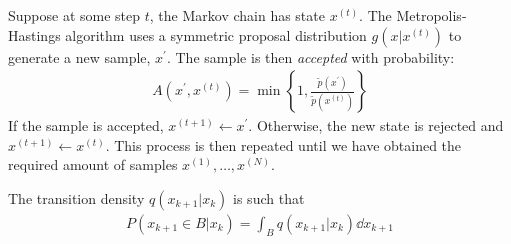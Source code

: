 Suppose at some step $t$, the Markov chain has state $x^{(t)}$. The Metropolis-Hastings algorithm uses a symmetric proposal distribution $g(x|x^{(t)})$ to generate a new sample, $x^\prime$. The sample is then \emph{accepted} with probability:
\begin{align*}
    A(x^{\prime}, x^{(t)}) = \min\left\{1, \frac{\tilde{p}(x^\prime)}{\tilde{p}(x^{(t)})}\right\}
\end{align*}
If the sample is accepted, $x^{(t+1)} \gets x^\prime$. Otherwise, the new state is rejected and $x^{(t+1)} \gets x^{(t)}$. This process is then repeated until we have obtained the required amount of samples $x^{(1)},\dots,x^{(N)}$. 


The transition density $q(x_{k+1}|x_k)$ is such that 
\begin{align}
    P(x_{k+1} \in B | x_k ) = \int_B q (x_{k+1}|x_k )\dd x_{k+1}
\end{align}

